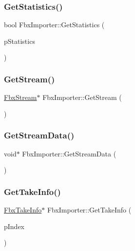 \subsubsection{\texorpdfstring{Get\+Statistics()}{GetStatistics()}}
{\footnotesize\ttfamily bool Fbx\+Importer\+::\+Get\+Statistics (\begin{DoxyParamCaption}\item[{\hyperlink{class_fbx_statistics}{Fbx\+Statistics} $\ast$}]{p\+Statistics }\end{DoxyParamCaption})}

\mbox{\label{class_fbx_importer_a7df99385df3407f5c17a9badf748fcab}} 
\subsubsection{\texorpdfstring{Get\+Stream()}{GetStream()}}
{\footnotesize\ttfamily \hyperlink{class_fbx_stream}{Fbx\+Stream}$\ast$ Fbx\+Importer\+::\+Get\+Stream (\begin{DoxyParamCaption}{ }\end{DoxyParamCaption})}

\mbox{\label{class_fbx_importer_ab6b8c23dbcfa775b97467e430ff204ec}} 
\subsubsection{\texorpdfstring{Get\+Stream\+Data()}{GetStreamData()}}
{\footnotesize\ttfamily void$\ast$ Fbx\+Importer\+::\+Get\+Stream\+Data (\begin{DoxyParamCaption}{ }\end{DoxyParamCaption})}

\mbox{\label{class_fbx_importer_a6733de02d09423cfc5cdabd808954e62}} 
\subsubsection{\texorpdfstring{Get\+Take\+Info()}{GetTakeInfo()}}
{\footnotesize\ttfamily \hyperlink{class_fbx_take_info}{Fbx\+Take\+Info}$\ast$ Fbx\+Importer\+::\+Get\+Take\+Info (\begin{DoxyParamCaption}\item[{int}]{p\+Index }\end{DoxyParamCaption})}

